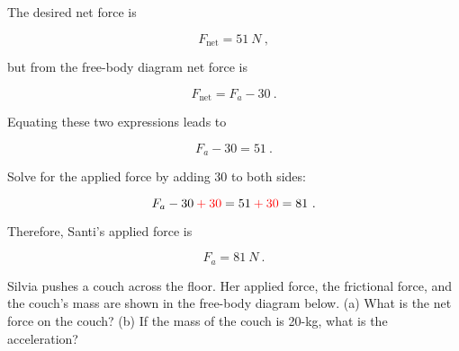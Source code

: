 \documentclass[main.tex]{subfiles}
\begin{document}
The desired net force is

\begin{equation*}
    F_{\text{net}} = \SI{51}{N}\ ,
\end{equation*}

but from the free-body diagram net force is

\begin{equation*}
    F_{\text{net}} = F_a - 30\ .
\end{equation*}

Equating these two expressions leads to

\begin{equation*}
    F_a - 30 = 51\ .
\end{equation*}

Solve for the applied force by adding 30 to both sides:

\begin{equation*}
    F_a - 30 \mathbin{\textcolor{red}{+}} \textcolor{red}{30} 
    = 51 \mathbin{\textcolor{red}{+}} \textcolor{red}{30} = 81\ .
\end{equation*}

Therefore, Santi's applied force is

\begin{equation*}
    F_a = \SI{81}{N}\ .
\end{equation*}

\begin{example} \label{ex:SilviaCouch} 
Silvia pushes a couch across the floor. Her applied force, the frictional force, and the couch's mass are shown in the free-body diagram below. (a) What is the net force on the couch? (b) If the mass of the couch is 20-kg, what is the acceleration? 
\end{example}
\vspace{-1em}

\begin{center}
    
\end{center}
\end{document}
